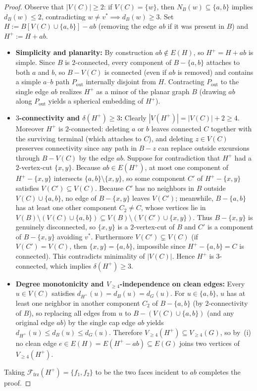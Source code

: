 \documentclass[11pt,reqno]{amsart}
\theoremstyle{plain}
\theoremstyle{definition}
\theoremstyle{remark}
\newcommand{\Ffrz}{\mathcal{F}_{\mathrm{frz}}}
\newcommand{\Vge}{V_{\ge 4}}
\DeclareRobustCommand{\_}{\ifmmode\text{\textunderscore}\else\textunderscore\allowbreak\fi}
\begin{document}
\begin{proof}
Observe that $|V(C)| \ge 2$: if $V(C) = \{w\}$, then $N_B(w) \subseteq \{a, b\}$ implies $d_B(w) \le 2$, contradicting $w \neq v^* \implies d_B(w) \ge 3$. Set $H := B[V(C) \cup \{a, b\}] - ab$ (removing the edge $ab$ if it was present in $B$) and $H^+ := H + ab$.
\begin{itemize}[leftmargin=1.8em]
  \item \textbf{Simplicity and planarity:} By construction $ab \notin E(H)$, so $H^+ = H + ab$ is simple. Since $B$ is $2$-connected, every component of $B - \{a, b\}$ attaches to both $a$ and $b$, so $B - V(C)$ is connected (even if $ab$ is removed) and contains a simple $a$--$b$ path $P_{\mathrm{out}}$ internally disjoint from $H$. Contracting $P_{\mathrm{out}}$ to the single edge $ab$ realizes $H^+$ as a minor of the planar graph $B$ (drawing $ab$ along $P_{\mathrm{out}}$ yields a spherical embedding of $H^+$).
  \item \textbf{$3$-connectivity and $\delta(H^+) \ge 3$:} Clearly $|V(H^+)| = |V(C)| + 2 \ge 4$. Moreover $H^+$ is $2$-connected: deleting $a$ or $b$ leaves connected $C$ together with the surviving terminal (which attaches to $C$), and deleting $z \in V(C)$ preserves connectivity since any path in $B - z$ can replace outside excursions through $B - V(C)$ by the edge $ab$. Suppose for contradiction that $H^+$ had a $2$-vertex-cut $\{x, y\}$. Because $ab \in E(H^+)$, at most one component of $H^+ - \{x, y\}$ intersects $\{a, b\} \setminus \{x, y\}$, so some component $C'$ of $H^+ - \{x, y\}$ satisfies $V(C') \subseteq V(C)$. Because $C'$ has no neighbors in $B$ outside $V(C) \cup \{a, b\}$, no edge of $B - \{x, y\}$ leaves $V(C')$; meanwhile, $B - \{a, b\}$ has at least one other component $C_2 \neq C$, whose vertices lie in $V(B) \setminus (V(C) \cup \{a, b\}) \subseteq V(B) \setminus (V(C') \cup \{x, y\})$. Thus $B - \{x, y\}$ is genuinely disconnected, so $\{x, y\}$ is a $2$-vertex-cut of $B$ and $C'$ is a component of $B - \{x, y\}$ avoiding $v^*$. Furthermore $V(C') \subsetneq V(C)$ (if $V(C') = V(C)$, then $\{x, y\} = \{a, b\}$, impossible since $H^+ - \{a, b\} = C$ is connected). This contradicts minimality of $|V(C)|$. Hence $H^+$ is $3$-connected, which implies $\delta(H^+) \ge 3$.
  \item \textbf{Degree monotonicity and $\Vge$-independence on clean edges:} Every $u \in V(C)$ satisfies $d_{H^+}(u) = d_B(u) = d_G(u)$. For $u \in \{a, b\}$, $u$ has at least one neighbor in another component $C_2$ of $B - \{a, b\}$ (by $2$-connectivity of $B$), so replacing all edges from $u$ to $B - (V(C) \cup \{a, b\})$ (and any original edge $ab$) by the single cap edge $ab$ yields $d_{H^+}(u) \le d_B(u) \le d_G(u)$. Therefore $\Vge(H^+) \subseteq \Vge(G)$, so by~(i) no clean edge $e \in E(H) = E(H^+ - ab) \subseteq E(G)$ joins two vertices of $\Vge(H^+)$.
\end{itemize}
Taking $\Ffrz(H^+) = \{f_1, f_2\}$ to be the two faces incident to $ab$ completes the proof.
\end{proof}
\end{document}
